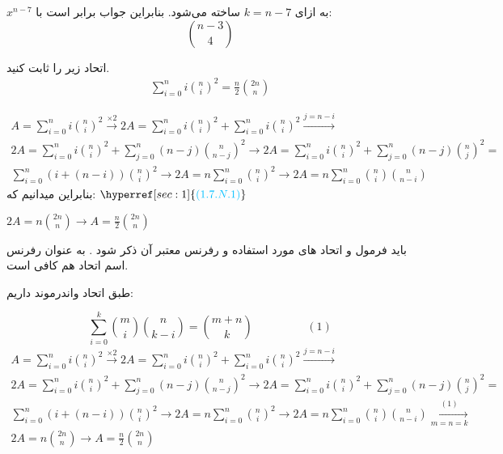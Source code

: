 \documentclass[11pt,largemargins]{h2wp}
\begin{document}
                $x^{n - 7}$ به ازای $k = n -7$ ساخته می‌شود. بنابراین جواب برابر است با:\\
               
                    $$\binom{n - 3}{4}$$
        

\question
 اتحاد زیر را ثابت کنید.
     \begin{align*}
     \sum_{i=0}^{n} i{\binom{n}{i}}^2 = \frac{n}{2} \binom{2n}{n}
     \end{align*}
     
\solution
\begin{align*}
A=\sum_{i=0}^{n} i{\binom{n}{i}}^2 \xrightarrow{\times 2} 2A = \sum_{i=0}^{n} i{\binom{n}{i}}^2 + \sum_{i=0}^{n} i{\binom{n}{i}}^2 \xrightarrow{ j=n-i } \\ 
2A = \sum_{i=0}^{n} i{\binom{n}{i}}^2 + \sum_{j=0}^{n} (n-j){\binom{n}{n-j}}^2 \rightarrow 2A = \sum_{i=0}^{n} i{\binom{n}{i}}^2 + \sum_{j=0}^{n} (n-j){\binom{n}{j}}^2 = \\
 \sum_{i=0}^{n} (i + (n-i)) {\binom{n}{i}}^2 \rightarrow 2A = n \sum_{i=0}^{n} {\binom{n}{i}}^2 \rightarrow 2A = n \sum_{i=0}^{n} \binom{n}{i} \binom{n}{n-i}
\end{align*}
بنابراین میدانیم که:
  $ \hyperref[sec:1]{\textcolor{capri}{(1.7.N.1)}}  $
  \begin{center}
  $  2A = n\binom{2n}{n} \rightarrow A= \frac{n}{2} \binom{2n}{n} $
  \end{center}


\notes

\Nnote  باید فرمول و اتحاد های مورد استفاده و رفرنس معتبر آن ‌ذکر شود . به عنوان رفرنس اسم اتحاد هم کافی است. 
 \label{sec:1}         	 
 
 
 طبق اتحاد واندرموند داریم:

$$ \sum_{i=0}^{k} \binom{m}{i} \binom{n}{k-i} = \binom {m+n}{k} \hspace{2cm} (1) $$
\begin{align*}
A=\sum_{i=0}^{n} i{\binom{n}{i}}^2 \xrightarrow{\times 2} 2A = \sum_{i=0}^{n} i{\binom{n}{i}}^2 + \sum_{i=0}^{n} i{\binom{n}{i}}^2 \xrightarrow{ j=n-i } \\ 
2A = \sum_{i=0}^{n} i{\binom{n}{i}}^2 + \sum_{j=0}^{n} (n-j){\binom{n}{n-j}}^2 \rightarrow 2A = \sum_{i=0}^{n} i{\binom{n}{i}}^2 + \sum_{j=0}^{n} (n-j){\binom{n}{j}}^2 = \\
 \sum_{i=0}^{n} (i + (n-i)) {\binom{n}{i}}^2 \rightarrow 2A = n \sum_{i=0}^{n} {\binom{n}{i}}^2 \rightarrow 2A = n \sum_{i=0}^{n} \binom{n}{i} \binom{n}{n-i} \xrightarrow[m=n=k]{(1)} \\
 2A= n \binom{2n}{n} \rightarrow A= \frac{n}{2} \binom{2n}{n}
\end{align*}
\end{document}
